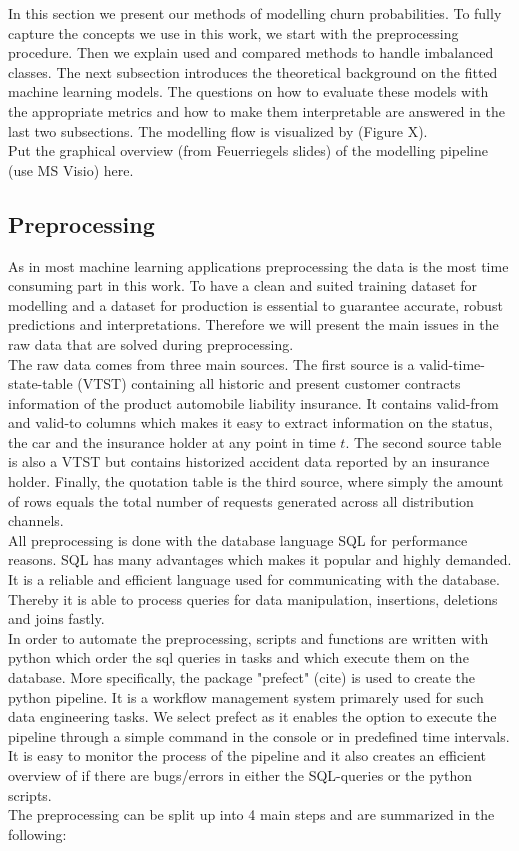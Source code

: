 \documentclass[12pt,titlepage]{article}
\begin{document}
In this section we present our methods of modelling churn probabilities. To fully capture the concepts we use in this work, we start with the preprocessing procedure. Then we explain used and compared methods to handle imbalanced classes. The next subsection introduces the theoretical background on the fitted machine learning models. The questions on how to evaluate these models with the appropriate metrics and how to make them interpretable are answered in the last two subsections. The modelling flow is visualized by (Figure X). \\
Put the graphical overview (from Feuerriegels slides) of the modelling pipeline (use MS Visio) here. \\

\subsection{Preprocessing} \par

As in most machine learning applications preprocessing the data is the most time consuming part in this work. To have a clean and suited training dataset for modelling and a dataset for production is essential to guarantee accurate, robust predictions and interpretations. Therefore we will present the main issues in the raw data that are solved during preprocessing. \\
The raw data comes from three main sources. The first source is a valid-time-state-table (VTST) containing all historic and present customer contracts information of the product automobile liability insurance. It contains valid-from and valid-to columns which makes it easy to extract information on the status, the car and the insurance holder at any point in time $t$. The second source table is also a VTST but contains historized accident data reported by an insurance holder. Finally, the quotation table is the third source, where simply the amount of rows equals the total number of requests generated across all distribution channels. \\
All preprocessing is done with the database language SQL for performance reasons. SQL has many advantages which makes it popular and highly demanded. It is a reliable and efficient language used for communicating with the database. Thereby it is able to process queries for data manipulation, insertions, deletions and joins fastly. \\
In order to automate the preprocessing, scripts and functions are written with python which order the sql queries in tasks and which execute them on the database. More specifically, the package "prefect" (cite) is used to create the python pipeline. It is a workflow management system primarely used for such data engineering tasks. We select prefect as it enables the option to execute the pipeline through a simple command in the console or in predefined time intervals. It is easy to monitor the process of the pipeline and it also creates an efficient overview of if there are bugs/errors in either the SQL-queries or the python scripts. \\
The preprocessing can be split up into 4 main steps and are summarized in the following: \\
\end{document}
